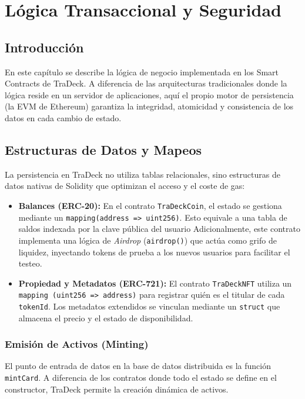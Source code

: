 \chapter{Lógica Transaccional y Seguridad}\label{cap:logica}

\section{Introducción}
En este capítulo se describe la lógica de negocio implementada en los Smart Contracts de TraDeck. 
A diferencia de las arquitecturas tradicionales donde la lógica reside en un servidor de aplicaciones, 
aquí el propio motor de persistencia (la EVM de Ethereum) garantiza la integridad, atomicidad y consistencia 
de los datos en cada cambio de estado.

\section{Estructuras de Datos y Mapeos}
La persistencia en TraDeck no utiliza tablas relacionales, sino estructuras de datos nativas de Solidity 
que optimizan el acceso y el coste de gas:
\begin{itemize}
	\item \textbf{Balances (ERC-20):} En el contrato \texttt{TraDeckCoin}, el estado se gestiona mediante 
	un \texttt{mapping(address => uint256)}. Esto equivale a una tabla de saldos indexada por la clave pública 
	del usuario Adicionalmente, este contrato implementa una lógica de \textit{Airdrop} (\texttt{airdrop()}) que 
	actúa como grifo de liquidez, inyectando tokens de prueba a los nuevos usuarios para facilitar el testeo.
	\item \textbf{Propiedad y Metadatos (ERC-721):} El contrato \texttt{TraDeckNFT} utiliza un \texttt{mapping
	(uint256 => address)} para registrar quién es el titular de cada \texttt{tokenId}. Los metadatos extendidos 
	se vinculan mediante un \texttt{struct} que almacena el precio y el estado de disponibilidad.
\end{itemize}

\subsection{Emisión de Activos (Minting)}
El punto de entrada de datos en la base de datos distribuida es la función \texttt{mintCard}. A diferencia de los 
contratos donde todo el estado se define en el constructor, TraDeck permite la creación dinámica de activos.\\

